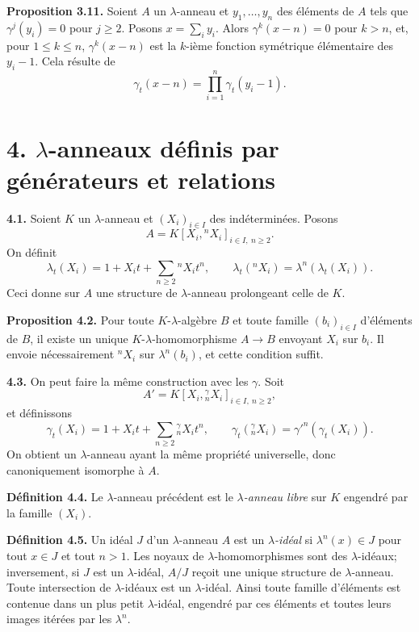 \documentclass[11pt]{article}
\begin{document}
\textbf{Proposition 3.11.} Soient \(A\) un \(\lambda\)-anneau et \(y_1,\ldots,y_n\) des éléments de \(A\) tels que \(\gamma^j(y_i)=0\) pour \(j\ge2\). Posons \(x=\sum_i y_i\). Alors \(\gamma^k(x-n)=0\) pour \(k>n\), et, pour \(1\le k\le n\), \(\gamma^k(x-n)\) est la \(k\)-ième fonction symétrique élémentaire des \(y_i-1\). Cela résulte de
\[
  \gamma_t(x-n)=\prod_{i=1}^{n}\gamma_t(y_i-1).
\]

\section*{4. \(\lambda\)-anneaux définis par générateurs et relations}

\textbf{4.1.} Soient \(K\) un \(\lambda\)-anneau et \((X_i)_{i\in I}\) des indéterminées. Posons
\[
  A=K[X_i,{}^nX_i]_{i\in I,\ n\ge2}.
\]
On définit
\begin{equation}\tag{4.1.1}
  \lambda_t(X_i)=1+X_it+\sum_{n\ge2}{}^nX_i t^n,
  \qquad
  \lambda_t({}^nX_i)=\lambda^n(\lambda_t(X_i)).
\end{equation}
Ceci donne sur \(A\) une structure de \(\lambda\)-anneau prolongeant celle de \(K\).

\textbf{Proposition 4.2.} Pour toute \(K\)-\(\lambda\)-algèbre \(B\) et toute famille \((b_i)_{i\in I}\) d'éléments de \(B\), il existe un unique \(K\)-\(\lambda\)-homomorphisme \(A\to B\) envoyant \(X_i\) sur \(b_i\). Il envoie nécessairement \({}^nX_i\) sur \(\lambda^n(b_i)\), et cette condition suffit.

\textbf{4.3.} On peut faire la même construction avec les \(\gamma\). Soit
\[
  A'=K[X_i,{}^\gamma_nX_i]_{i\in I,\ n\ge2},
\]
et définissons
\begin{equation}\tag{4.3.1}
  \gamma_t(X_i)=1+X_it+\sum_{n\ge2}{}^\gamma_nX_i t^n,
  \qquad
  \gamma_t({}^\gamma_nX_i)=\gamma'^n(\gamma_t(X_i)).
\end{equation}
On obtient un \(\lambda\)-anneau ayant la même propriété universelle, donc canoniquement isomorphe à \(A\).

\textbf{Définition 4.4.} Le \(\lambda\)-anneau précédent est le \emph{\(\lambda\)-anneau libre} sur \(K\) engendré par la famille \((X_i)\).

\textbf{Définition 4.5.} Un idéal \(J\) d'un \(\lambda\)-anneau \(A\) est un \emph{\(\lambda\)-idéal} si \(\lambda^n(x)\in J\) pour tout \(x\in J\) et tout \(n>1\). Les noyaux de \(\lambda\)-homomorphismes sont des \(\lambda\)-idéaux; inversement, si \(J\) est un \(\lambda\)-idéal, \(A/J\) reçoit une unique structure de \(\lambda\)-anneau. Toute intersection de \(\lambda\)-idéaux est un \(\lambda\)-idéal. Ainsi toute famille d'éléments est contenue dans un plus petit \(\lambda\)-idéal, engendré par ces éléments et toutes leurs images itérées par les \(\lambda^n\).
\end{document}
